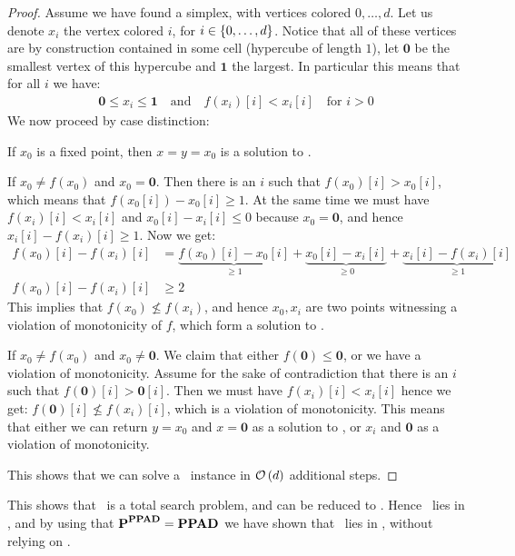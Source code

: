 \begin{proof}
    Assume we have found a simplex, with vertices colored $0, \dots, d$. Let us denote $x_i$ the vertex colored $i$, for $i \in \left\{0, \dots, d\right\}$. Notice that all of these vertices are by construction contained in some cell (hypercube of length $1$), let $\mathbf{0}$ be the smallest vertex of this hypercube and $\mathbf{1}$ the largest. In particular this means that for all $i$ we have:
    \begin{align*}
        \mathbf{0} \leq x_i \leq \mathbf{1} \quad \text{and} \quad f(x_i)[i] < x_i[i] \quad \text{for $i > 0$}
    \end{align*}
    We now proceed by case distinction:
    \begin{case}{1}
        If $x_0$ is a fixed point, then $x = y = x_0$ is a solution to \Tarskistar.
    \end{case}
    \begin{case}{2}
        If $x_0 \neq f(x_0)$ and $x_0 = \mathbf{0}$. Then there is an $i$ such that $f(x_0)[i] > x_0[i]$, which means that $f(x_0[i]) - x_0[i] \geq 1$. At the same time we must have $f(x_i)[i] < x_i[i]$ and $x_0[i] - x_i[i] \leq 0$ because $x_0 = \mathbf{0}$, and hence $x_i[i] - f(x_i)[i] \geq 1$. Now we get:
        \begin{align*}
            f(x_0)[i] - f(x_i)[i] & = \underbrace{f(x_0)[i] - x_0[i]}_{\geq 1} + \underbrace{x_0[i] - x_i[i]}_{\geq 0} + \underbrace{x_i[i] - f(x_i)[i]}_{\geq 1} \\
            f(x_0)[i] - f(x_i)[i] & \geq 2
        \end{align*}
        This implies that $f(x_0) \not \leq f(x_i)$, and hence $x_0, x_i$ are two points witnessing a violation of monotonicity of $f$, which form a solution to \Tarskistar.
    \end{case}
    \begin{case}{3}
        If $x_0 \neq f(x_0)$ and $x_0 \neq \mathbf{0}$. We claim that either $f(\mathbf{0}) \leq \mathbf{0}$, or we have a violation of monotonicity. Assume for the sake of contradiction that there is an $i$ such that $f(\mathbf{0})[i] > \mathbf{0}[i]$. Then we must have $f(x_i)[i] < x_i[i]$ hence we get: $f(\mathbf{0})[i] \not\leq f(x_i)[i]$, which is a violation of monotonicity. This means that either we can return $y = x_0$ and $x = \mathbf{0}$ as a solution to \Tarskistar, or $x_i$ and $\mathbf{0}$ as a violation of monotonicity.
    \end{case}
    This shows that we can solve a \Tarskistar\ instance in $\mathcal{O}\left(d\right)$ additional steps.
\end{proof}
This shows that \Tarskistar\ is a total search problem, and can be reduced to \Sperner. Hence \Tarskistar\ lies in \PPAD, and by using that $\textbf{P}^{\textbf{PPAD}} = \textbf{PPAD}$ we have shown that \Tarski\ lies in \PPAD, without relying on \Brouwer.
